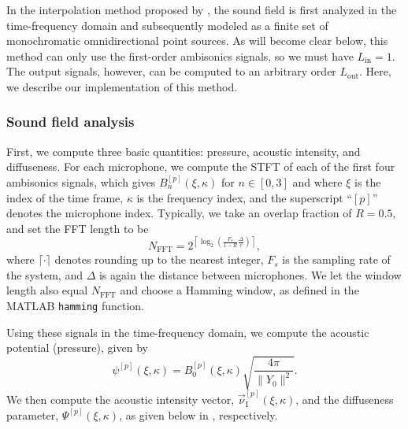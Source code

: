 In the interpolation method proposed by \citet{Thiergart2013}, the sound field is first analyzed in the time-frequency domain and subsequently modeled as a finite set of monochromatic omnidirectional point sources.
As will become clear below, this method can only use the first-order ambisonics signals, so we must have $L_\text{in} = 1$.
The output signals, however, can be computed to an arbitrary order $L_\text{out}$.
Here, we describe our implementation of this method.

\subsubsection{Sound field analysis}
First, we compute three basic quantities: pressure, acoustic intensity, and diffuseness.
For each microphone, we compute the STFT of each of the first four ambisonics signals, which gives $B^{[p]}_n(\xi,\kappa)$ for $n \in [0,3]$ and where $\xi$ is the index of the time frame, $\kappa$ is the frequency index, and the superscript ``$[p]$'' denotes the microphone index.
Typically, we take an overlap fraction of $R = 0.5$, and set the FFT length to be
\begin{equation}
N_\textrm{FFT} = 2^{\left\lceil \log_2 \left( \frac{F_s}{1-R} \frac{\Delta}{c} \right) \right\rceil},
\end{equation}
where $\lceil \cdot \rceil$ denotes rounding up to the nearest integer, $F_s$ is the sampling rate of the system, and $\Delta$ is again the distance between microphones.
We let the window length also equal $N_\textrm{FFT}$ and choose a Hamming window, as defined in the MATLAB \texttt{hamming} function.

Using these signals in the time-frequency domain, we compute the acoustic potential (pressure), given by
\begin{equation}\label{eq:03_Navigation_Techniques:Time-Frequency_Potential}
\psi^{[p]}(\xi,\kappa) = B^{[p]}_0(\xi,\kappa) \sqrt{\frac{4\pi}{\|Y_0\|^2}}.
\end{equation}
We then compute the acoustic intensity vector, $\vec{\nu}^{[p]}_\textrm{I}(\xi,\kappa)$, and the diffuseness parameter, $\Psi^{[p]}(\xi,\kappa)$, as given below in , respectively.

